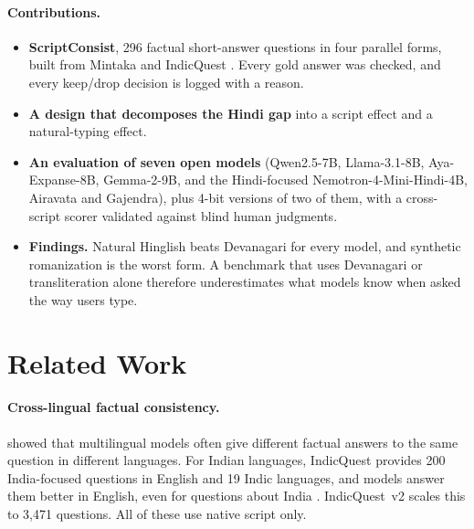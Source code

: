 \documentclass[11pt]{article}
\newcommand{\Dev}{Devanagari}
\newcommand{\HngC}{Natural Hinglish}
\begin{document}
\paragraph{Contributions.}
\begin{itemize}\setlength\itemsep{0pt}
\item \textbf{ScriptConsist}, 296 factual short-answer questions in four parallel forms, built from Mintaka \citep{sen2022mintaka} and IndicQuest \citep{rohera2024indicquest}. Every gold answer was checked, and every keep/drop decision is logged with a reason.
\item \textbf{A design that decomposes the Hindi gap} into a script effect and a natural-typing effect.
\item \textbf{An evaluation of seven open models} (Qwen2.5-7B, Llama-3.1-8B, Aya-Expanse-8B, Gemma-2-9B, and the Hindi-focused Nemotron-4-Mini-Hindi-4B, Airavata and Gajendra), plus 4-bit versions of two of them, with a cross-script scorer validated against blind human judgments.
\item \textbf{Findings.} \HngC{} beats \Dev{} for every model, and synthetic romanization is the worst form. A benchmark that uses \Dev{} or transliteration alone therefore underestimates what models know when asked the way users type.
\end{itemize}

\section{Related Work}

\paragraph{Cross-lingual factual consistency.}
\citet{qi2023crosslingual} showed that multilingual models often give different factual answers to the same question in different languages.
For Indian languages, IndicQuest \citep{rohera2024indicquest} provides 200 India-focused questions in English and 19 Indic languages, and models answer them better in English, even for questions about India \citep{rohera2025better}.
IndicQuest~v2 \citep{jain2026indicquestv2} scales this to 3{,}471 questions.
All of these use native script only.
\end{document}
